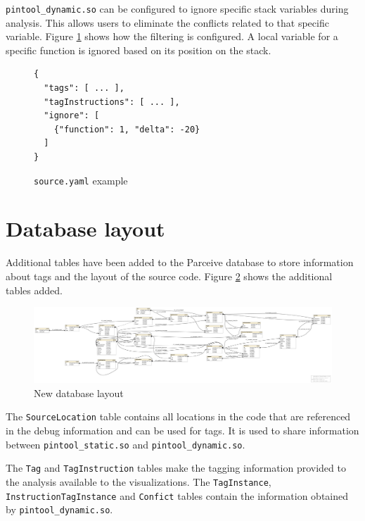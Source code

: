 \texttt{pintool\_dynamic.so} can be configured to ignore specific stack variables during analysis. This allows users to eliminate the conflicts related to that specific variable. Figure \ref{cap3:ignore-example} shows how the filtering is configured. A local variable for a specific function is ignored based on its position on the stack.

\begin{figure}
	\begin{center}
		\begin{verbatim}
{
  "tags": [ ... ],
  "tagInstructions": [ ... ],
  "ignore": [
    {"function": 1, "delta": -20}
  ]
}
		\end{verbatim}
	\end{center}
	\caption{\texttt{source.yaml} example}
	\label{cap3:ignore-example}
\end{figure}

\section{Database layout}

Additional tables have been added to the Parceive database to store information about tags and the layout of the source code. Figure \ref{cap3:dblayout} shows the additional tables added.

\begin{figure}
	\centering
	\includegraphics[width=1\textwidth]{new-schema}
	\caption{New database layout}
	\label{cap3:dblayout}
\end{figure}

The \texttt{SourceLocation} table contains all locations in the code that are referenced in the debug information and can be used for tags. It is used to share information between \texttt{pintool\_static.so} and \texttt{pintool\_dynamic.so}.

The \texttt{Tag} and \texttt{TagInstruction} tables make the tagging information provided to the analysis available to the visualizations. The \texttt{TagInstance}, \texttt{InstructionTagInstance} and \texttt{Confict} tables contain the information obtained by \texttt{pintool\_dynamic.so}.

